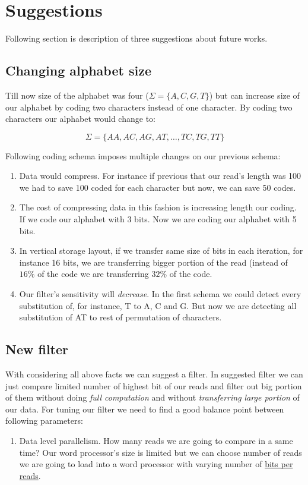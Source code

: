 \section{Suggestions}

Following section is description of three suggestions about future works.

\subsection{Changing alphabet size}
Till now size of the alphabet was four ($\Sigma = \{A,C,G,T\}$) but can increase size of our alphabet by coding two characters instead of one character. By coding two characters our alphabet would change to:

\begin{equation}
\nonumber
\Sigma = \{ AA, AC, AG, AT, \dots, TC, TG, TT \}
\end{equation}

Following coding schema imposes multiple changes on our previous schema:

\begin{enumerate}
\item Data would compress. For instance if previous that our read's length was 100 we had to save 100 coded for each character but now, we can save 50 codes.
\item The cost of compressing data in this fashion is increasing length our coding. If we code our alphabet with 3 bits. Now we are coding our alphabet with 5 bits.
\item In vertical storage layout, if we transfer same size of bits in each iteration, for instance 16 bits, we are transferring bigger portion of the read (instead of $16\%$ of the code we are transferring $32\%$ of the code.
\item Our filter's sensitivity will \emph{decrease}. In the first schema we could detect every substitution of, for instance, T to A, C and G. But now we are detecting all substitution of AT to rest of permutation of characters.
\end{enumerate}
 
\subsection{New filter}
With considering all above facts we can suggest a filter. In suggested filter we can just compare limited number of highest bit of our reads and filter out big portion of them without doing \emph{full computation} and without \emph{transferring large portion} of our data. For tuning our filter we need to find a good balance point between following parameters:

\begin{enumerate}
\item Data level parallelism. How many reads we are going to compare in a same time? Our word processor's size is limited but we can choose number of reads we are going to load into a word processor with varying number of \underline{bits per reads}.
\end{enumerate}
  
  